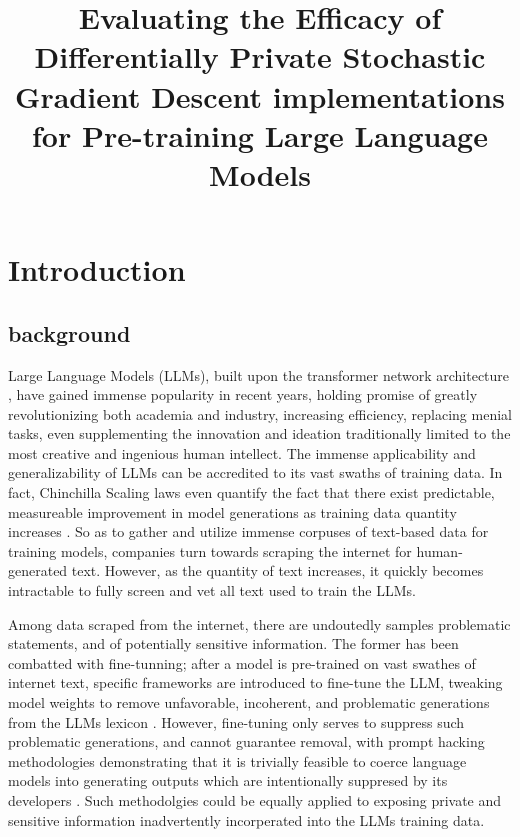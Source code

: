 \documentclass{article}
\title{Evaluating the Efficacy of Differentially Private Stochastic Gradient Descent implementations for Pre-training Large Language Models}
\begin{document}
\maketitle

\section{Introduction}

\subsection{background}

Large Language Models (LLMs), built upon the transformer network architecture \cite{vaswani2023}, have gained immense popularity in recent years, holding promise of greatly revolutionizing both academia and industry, increasing efficiency, replacing menial tasks, even supplementing the innovation and ideation traditionally limited to the most creative and ingenious human intellect. The immense applicability and generalizability of LLMs can be accredited to its vast swaths of training data. In fact, Chinchilla Scaling laws even quantify the fact that there exist predictable, measureable improvement in model generations as training data quantity increases \cite{hoffmann2022}. So as to gather and utilize immense corpuses of text-based data for training models, companies turn towards scraping the internet for human-generated text. However, as the quantity of text increases, it quickly becomes intractable to fully screen and vet all text used to train the LLMs. 

Among data scraped from the internet, there are undoutedly samples problematic statements, and of potentially sensitive information. The former has been combatted with fine-tunning; after a model is pre-trained on vast swathes of internet text, specific frameworks are introduced to fine-tune the LLM, tweaking model weights to remove unfavorable, incoherent, and problematic generations from the LLMs lexicon \cite{parthasarathy2024}. However, fine-tuning only serves to suppress such problematic generations, and cannot guarantee removal, with prompt hacking methodologies demonstrating that it is trivially feasible to coerce language models into generating outputs which are intentionally suppresed by its developers \cite{rababah2024}. Such methodolgies could be equally applied to exposing private and sensitive information inadvertently incorperated into the LLMs training data. 
\end{document}
